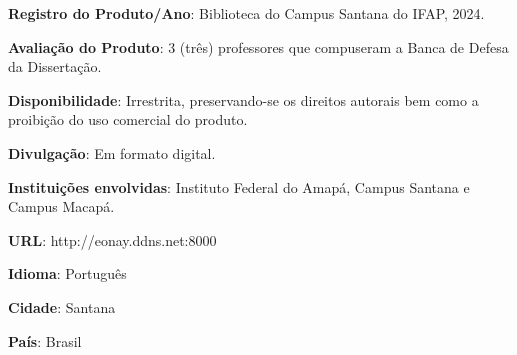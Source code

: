 \begin{apendicesenv}
\begin{flushleft}
\textbf{Registro do Produto/Ano}: Biblioteca do Campus Santana do IFAP, 2024.

\textbf{Avaliação do Produto}: 3 (três) professores que compuseram a Banca de Defesa da Dissertação.

 \textbf{Disponibilidade}: Irrestrita, preservando-se os direitos autorais bem como a proibição do uso comercial do produto.

\textbf{Divulgação}: Em formato digital.

\textbf{Instituições envolvidas}: Instituto Federal do Amapá, Campus Santana e Campus Macapá.

\textbf{URL}: http://eonay.ddns.net:8000

\textbf{Idioma}: Português

\textbf{Cidade}: Santana

\textbf{País}: Brasil
\end{flushleft}




\end{apendicesenv}